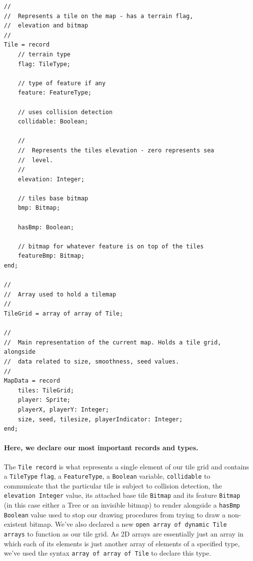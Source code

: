 \documentclass{article}
\begin{document}
\begin{verbatim}
//
//	Represents a tile on the map - has a terrain flag,
//	elevation and bitmap
//
Tile = record
	// terrain type
	flag: TileType;

	// type of feature if any
	feature: FeatureType;

	// uses collision detection
	collidable: Boolean;

	//
	//	Represents the tiles elevation - zero represents sea
	//	level.
	//
	elevation: Integer;

	// tiles base bitmap
	bmp: Bitmap;

	hasBmp: Boolean;

	// bitmap for whatever feature is on top of the tiles
	featureBmp: Bitmap;
end;

//
//	Array used to hold a tilemap
//
TileGrid = array of array of Tile;

//
//	Main representation of the current map. Holds a tile grid, alongside
//	data related to size, smoothness, seed values.
//
MapData = record
	tiles: TileGrid;
	player: Sprite;
	playerX, playerY: Integer;
	size, seed, tilesize, playerIndicator: Integer;
end;
\end{verbatim}

\paragraph{Here, we declare our most important records and types.} The \texttt{Tile record} is what represents a single element of our tile grid and contains a \texttt{TileType} \texttt{flag}, a \texttt{FeatureType}, a \texttt{Boolean} variable, \texttt{collidable} to communicate that the particular tile is subject to collision detection, the \texttt{elevation Integer} value, its attached base tile \texttt{Bitmap} and its feature \texttt{Bitmap} (in this case either a Tree or an invisible bitmap) to render alongside a \texttt{hasBmp Boolean} value used to stop our drawing procedures from trying to draw a non-existent bitmap. We've also declared a new \texttt{open array of dynamic Tile arrays} to function as our tile grid. As 2D arrays are essentially just an array in which each of its elements is just another array of elements of a specified type, we've used the syntax \texttt{array of array of Tile} to declare this type.
\end{document}
